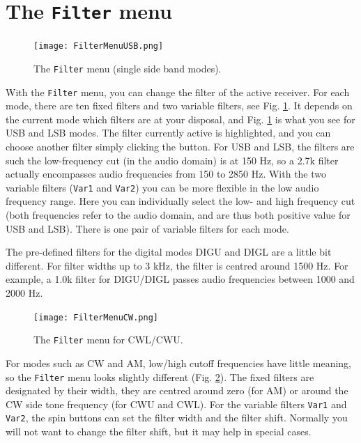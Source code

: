 \documentclass[12pt]{book}
\def\bltt#1{\texttt{\color{blue}#1}}
\begin{document}
\section{The \texttt{Filter} menu}

\begin{figure}[ht]
\center
\texttt{[image: FilterMenuUSB.png]}
\caption{The \bltt{Filter} menu (single side band modes).}
\label{fig:FilterMenuUSB}
\end{figure}

With the \bltt{Filter} menu, you can change the filter of the active receiver. For each mode,
there
are ten fixed filters and two variable filters, see Fig. \ref{fig:FilterMenuUSB}. It
depends on the current mode which filters are at your disposal, and Fig. \ref{fig:FilterMenuUSB}
is what you see for USB and LSB modes. The filter currently active is highlighted, and
you can choose another filter simply clicking the button. For USB and LSB, the filters
are such the low-frequency cut (in the audio domain) is at 150 Hz, so a 2.7k filter
actually encompasses audio frequencies from 150 to 2850 Hz. With the two variable filters
(\texttt{Var1} and \texttt{Var2}) you can be more flexible in the low audio frequency range. Here you
can individually select the low- and high frequency cut (both frequencies refer to
the audio domain, and are thus both positive value for USB and LSB). There is one pair of
variable filters for each mode.

The pre-defined filters for the digital modes DIGU and DIGL are a little bit different.
For filter widths up to 3 kHz, the filter is centred around 1500 Hz. For example,
a 1.0k filter for DIGU/DIGL passes audio frequencies between 1000 and 2000 Hz.

\begin{figure}[ht]
\center
\texttt{[image: FilterMenuCW.png]}
\caption{The \bltt{Filter} menu for CWL/CWU.}
\label{fig:FilterMenuCW}
\end{figure}

For modes such as CW and AM, low/high cutoff frequencies have little meaning, so the
\bltt{Filter} menu looks slightly different (Fig. \ref{fig:FilterMenuCW}). The fixed
filters are designated by their width, they are centred around zero (for AM) or around
the CW side tone frequency (for CWU and CWL). For the variable filters \texttt{Var1}
and \texttt{Var2},
the spin buttons can set the filter width and the filter shift. Normally you will not
want to change the filter shift, but it may help in special cases.
\end{document}
